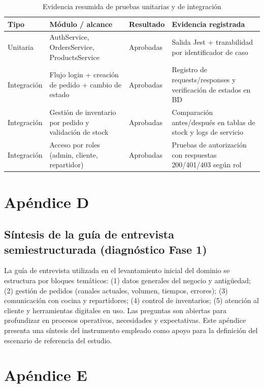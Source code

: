 \begin{table}[htbp]
\centering
\caption{Evidencia resumida de pruebas unitarias y de integración}
\label{tab:apendice-evidencia-pruebas}
\small
\begin{tabular}{|>{\raggedright\arraybackslash}p{2.0cm}|>{\raggedright\arraybackslash}p{4.0cm}|>{\raggedright\arraybackslash}p{2.5cm}|>{\raggedright\arraybackslash}p{4.2cm}|}
\hline
\textbf{Tipo} & \textbf{Módulo / alcance} & \textbf{Resultado} & \textbf{Evidencia registrada} \\
\hline
Unitaria & AuthService, OrdersService, ProductsService & Aprobadas & Salida Jest + trazabilidad por identificador de caso \\
\hline
Integración & Flujo login + creación de pedido + cambio de estado & Aprobadas & Registro de requests/responses y verificación de estados en BD \\
\hline
Integración & Gestión de inventario por pedido y validación de stock & Aprobadas & Comparación antes/después en tablas de stock y logs de servicio \\
\hline
Integración & Acceso por roles (admin, cliente, repartidor) & Aprobadas & Pruebas de autorización con respuestas 200/401/403 según rol \\
\hline
\end{tabular}
\end{table}

\chapter{Apéndice D}\label{ap:D}

\section*{Síntesis de la guía de entrevista semiestructurada (diagnóstico Fase 1)}

La guía de entrevista utilizada en el levantamiento inicial del dominio se estructura por bloques temáticos: (1) datos generales del negocio y antigüedad; (2) gestión de pedidos (canales actuales, volumen, tiempos, errores); (3) comunicación con cocina y repartidores; (4) control de inventarios; (5) atención al cliente y herramientas digitales en uso. Las preguntas son abiertas para profundizar en procesos operativos, necesidades y expectativas. Este apéndice presenta una síntesis del instrumento empleado como apoyo para la definición del escenario de referencia del estudio.

\chapter{Apéndice E}\label{ap:E}

